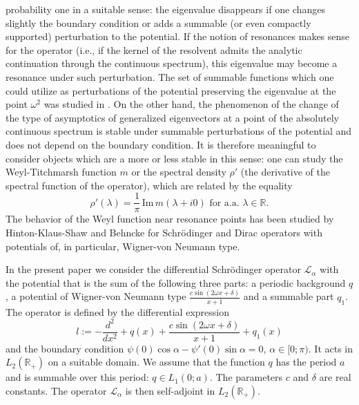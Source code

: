 \documentclass[a4paper,oneside,12pt]{amsart}
\begin{document}
probability one in a suitable sense: the eigenvalue disappears if
one changes slightly  the boundary condition or adds a summable
(or even compactly supported) perturbation  to the potential. If
the notion of resonances makes sense for the operator (i.e., if
the kernel of the resolvent admits the analytic continuation
through the continuous spectrum), this eigenvalue may become a
resonance under such perturbation. The set of summable functions
which one could utilize as perturbations of the potential
preserving the eigenvalue at the point $\omega^2$ was studied in
\cite{Herbst-2002}. On the other hand, the phenomenon of the
change of the type of asymptotics of generalized eigenvectors at a
point of the absolutely continuous spectrum is stable under
summable perturbations of the potential and does not depend on the
boundary condition. It is therefore meaningful to consider objects
which are a more or less stable in this sense: one can study the
Weyl-Titchmarsh function $m$ or the spectral density $\rho'$ (the
derivative of the spectral function of the operator), which are
related by the equality
\begin{equation*}
    \rho'(\lambda)=\frac1{\pi}\,\text{Im}\,m(\lambda+i0)\text{ for a.a. }\lambda\in\mathbb R.
\end{equation*}
The  behavior of the Weyl function near resonance points has been
studied by Hinton-Klaus-Shaw
\cite{Hinton-Klaus-Shaw-1991,Klaus-1991} and Behncke
\cite{Behncke-1991-I,Behncke-1991-II,Behncke-1994} for
Schr\"odinger and Dirac operators with potentials of, in
particular, Wigner-von Neumann type.

In the present paper we consider the  differential Schr\"odinger
operator $\mathcal L_{\alpha}$ with the potential that is the sum
of the following three parts: a periodic background $q$, a
potential of Wigner-von Neumann type $\frac{c\sin(2\omega
x+\delta)}{x+1}$ and a summable part $q_1$. The operator is
defined by the differential expression
\begin{equation}\label{l}
    l:=-\frac{d^2}{dx^2}
    +q(x)+\frac{c\sin(2\omega x+\delta)}{x+1}+q_1(x)
\end{equation}
and the boundary  condition
$\psi(0)\cos\alpha-\psi'(0)\sin\alpha=0$, $\alpha\in[0;\pi)$. It
acts in $L_2(\mathbb R_+)$ on a suitable domain. We assume that
the function $q$ has the period $a$ and is summable over this
period: $q\in L_1(0;a)$. The parameters $c$ and $\delta$ are real
constants. The operator $\mathcal L_{\alpha}$ is then self-adjoint
in $L_2(\mathbb R_+)$.
\end{document}
